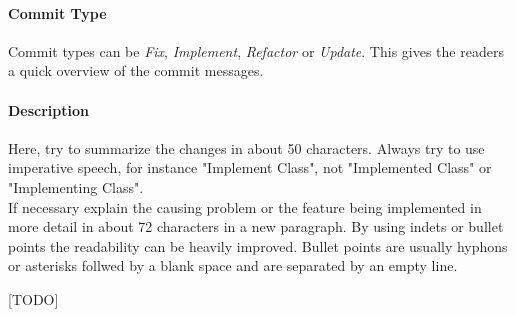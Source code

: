 \paragraph{Commit Type}
Commit types can be \textit{Fix}, \textit{Implement}, \textit{Refactor} or \textit{Update}. This gives the readers a quick overview of the commit messages.
\paragraph{Description}
Here, try to summarize the changes in about 50 characters. Always try to use imperative speech, for instance "Implement Class", not "Implemented Class" or "Implementing Class". \\
If necessary explain the causing problem or the feature being implemented in more detail in about 72 characters in a new paragraph. By using indets or bullet points the readability can be heavily improved. Bullet points are usually hyphons or asterisks follwed by a blank space and are separated by an empty line.



[TODO]
